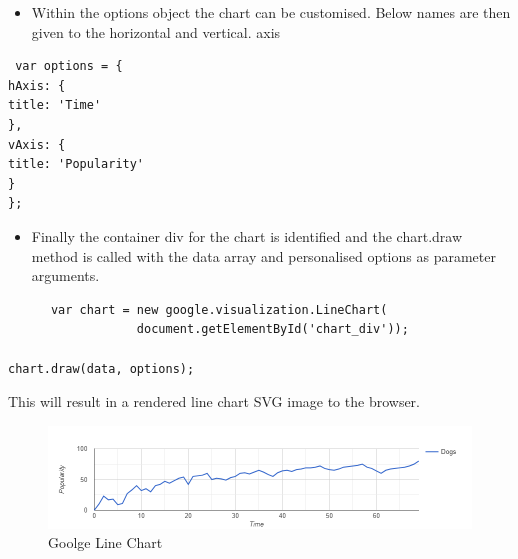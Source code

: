 \begin{itemize}
	\item Within the options object the chart can be customised. Below names are then given to the horizontal and vertical. axis~\cite{GoogleLineChart:online}
\end{itemize}
\begin{verbatim}
 var options = {
hAxis: {
title: 'Time'
},
vAxis: {
title: 'Popularity'
}
};

\end{verbatim}
\begin{itemize}
	\item Finally the container div for the chart is identified and the chart.draw method is called with the data array and personalised options as parameter arguments.~\cite{GoogleLineChart:online}
\end{itemize}
\begin{verbatim}
      var chart = new google.visualization.LineChart(
                  document.getElementById('chart_div'));

chart.draw(data, options);
\end{verbatim}
This will result in a rendered line chart SVG image to the browser.~\cite{GoogleLineChart:online}

\begin{figure}[H]
	\centering
	\includegraphics[width=0.7\linewidth]{img/goolgeChart}
	\caption{Goolge Line Chart}
	\label{fig:goolgechart}
\end{figure}

